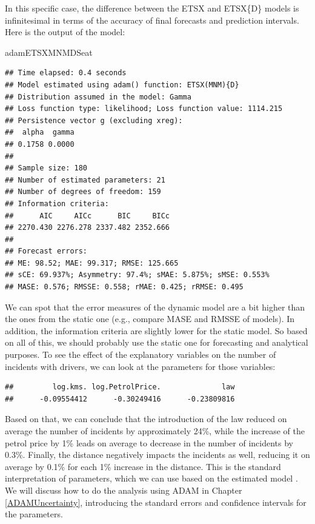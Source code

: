 \documentclass[
]{book}
\newenvironment{Shaded}{\begin{snugshade}}{\end{snugshade}}
\newcommand{\NormalTok}[1]{#1}
\newcommand{\SpecialCharTok}[1]{\textcolor[rgb]{0.00,0.00,0.00}{#1}}
\theoremstyle{definition}
\theoremstyle{definition}
\theoremstyle{definition}
\theoremstyle{definition}
\theoremstyle{remark}
\begin{document}
In this specific case, the difference between the ETSX and ETSX\{D\} models is infinitesimal in terms of the accuracy of final forecasts and prediction intervals. Here is the output of the model:

\begin{Shaded}
\begin{Highlighting}[]
\NormalTok{adamETSXMNMDSeat}
\end{Highlighting}
\end{Shaded}

\begin{verbatim}
## Time elapsed: 0.4 seconds
## Model estimated using adam() function: ETSX(MNM){D}
## Distribution assumed in the model: Gamma
## Loss function type: likelihood; Loss function value: 1114.215
## Persistence vector g (excluding xreg):
##  alpha  gamma 
## 0.1758 0.0000 
## 
## Sample size: 180
## Number of estimated parameters: 21
## Number of degrees of freedom: 159
## Information criteria:
##      AIC     AICc      BIC     BICc 
## 2270.430 2276.278 2337.482 2352.666 
## 
## Forecast errors:
## ME: 98.52; MAE: 99.317; RMSE: 125.665
## sCE: 69.937%; Asymmetry: 97.4%; sMAE: 5.875%; sMSE: 0.553%
## MASE: 0.576; RMSSE: 0.558; rMAE: 0.425; rRMSE: 0.495
\end{verbatim}

We can spot that the error measures of the dynamic model are a bit higher than the ones from the static one (e.g., compare MASE and RMSSE of models). In addition, the information criteria are slightly lower for the static model. So based on all of this, we should probably use the static one for forecasting and analytical purposes. To see the effect of the explanatory variables on the number of incidents with drivers, we can look at the parameters for those variables:

\begin{Shaded}
\end{Shaded}

\begin{verbatim}
##         log.kms. log.PetrolPrice.              law 
##      -0.09554412      -0.30249416      -0.23809816
\end{verbatim}

Based on that, we can conclude that the introduction of the law reduced on average the number of incidents by approximately 24\%, while the increase of the petrol price by 1\% leads on average to decrease in the number of incidents by 0.3\%. Finally, the distance negatively impacts the incidents as well, reducing it on average by 0.1\% for each 1\% increase in the distance. This is the standard interpretation of parameters, which we can use based on the estimated model \citep[see, for example, discussion in Section 8.3 of][]{SvetunkovSBA}. We will discuss how to do the analysis using ADAM in Chapter \ref{ADAMUncertainty}, introducing the standard errors and confidence intervals for the parameters.
\end{document}
